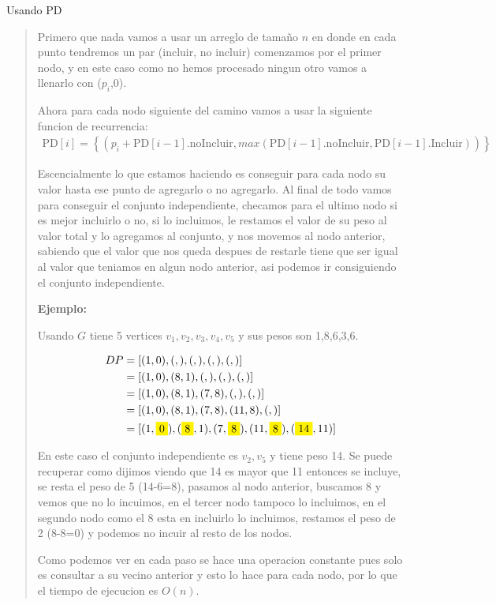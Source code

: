 \textcolor{bibi}{Usando PD}
\begin{quote}
    Primero que nada vamos a usar un arreglo de tamaño $n$ en donde en cada punto tendremos un par (incluir, no incluir) comenzamos por el primer nodo, y en este caso como no hemos procesado ningun otro vamos a llenarlo con ($p_i$,0).\vspace{.2cm}

    Ahora para cada nodo siguiente del camino vamos a usar la siguiente funcion de recurrencia:
    \begin{align*}
        \text{PD}[i] = \left\{
            (p_i + \text{PD}[i-1].\text{noIncluir}, max(\text{PD}[i-1].\text{noIncluir}, \text{PD}[i-1].\text{Incluir})) 
            \right\}
    \end{align*}

    Escencialmente lo que estamos haciendo es conseguir para cada nodo su valor hasta ese punto de agregarlo o no agregarlo. Al final de todo vamos para conseguir el conjunto independiente, checamos para el ultimo nodo si es mejor incluirlo o no, si lo incluimos, le restamos el valor de su peso al valor total y lo agregamos al conjunto, y nos movemos al nodo anterior, sabiendo que el valor que nos queda despues de restarle tiene que ser igual al valor que teniamos en algun nodo anterior, asi podemos ir consiguiendo el conjunto independiente. \vspace{.2cm}

    \textbf{Ejemplo:} \vspace{.2cm}

    Usando $G$ tiene 5 vertices ${v_1, v_2, v_3, v_4, v_5}$ y sus pesos son {1,8,6,3,6}. \vspace{.2cm}

    \begin{align*}
        DP &= [(1,0),(,),(,),(,),(,)] \\
        &= [(1,0),(8,1),(,),(,),(,)] \\
        &= [(1,0),(8,1),(7,8),(,),(,)] \\
        &= [(1,0),(8,1),(7,8),(11,8),(,)] \\
        &= [(1,\mathcolorbox{yellow}{0}),(\mathcolorbox{yellow}{8},1),(7,\mathcolorbox{yellow}{8}),(11,\mathcolorbox{yellow}{8}),(\mathcolorbox{yellow}{14},11)] \\
    \end{align*}

    En este caso el conjunto independiente es ${v_2,v_5}$ y tiene peso 14. Se puede recuperar como dijimos viendo que 14 es mayor que 11 entonces se incluye, se resta el peso de 5 (14-6=8), pasamos al nodo anterior, buscamos 8 y vemos que no lo incuimos, en el tercer nodo tampoco lo incluimos, en el segundo nodo como el 8 esta en incluirlo lo incluimos, restamos el peso de 2 (8-8=0) y podemos no incuir al resto de los nodos. \vspace{.2cm}

    Como podemos ver en cada paso se hace una operacion constante pues solo es consultar a su vecino anterior y esto lo hace para cada nodo, por lo que el tiempo de ejecucion es $O(n)$.
\end{quote}
